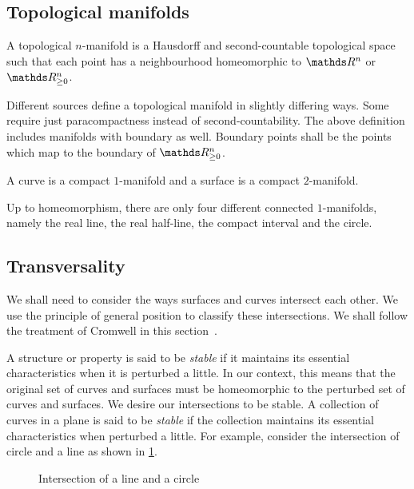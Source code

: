 \subsection{Topological manifolds}

\begin{defn}
    A topological \(n\)-manifold is a Hausdorff and second-countable topological space such that each point has a neighbourhood homeomorphic to \(\R^n\) or \(\R^n_{\geq 0}\).
\end{defn}

\begin{remark}
    Different sources define a topological manifold in slightly differing ways. Some require just paracompactness instead of second-countability. The above definition includes manifolds with boundary as well. Boundary points shall be the points which map to the boundary of \(\R^n_{\geq 0}\).
\end{remark}

\begin{defn}
    A curve is a compact \(1\)-manifold and a surface is a compact \(2\)-manifold.
\end{defn}

Up to homeomorphism, there are only four different connected \(1\)-manifolds, namely the real line, the real half-line, the compact interval and the circle.

\subsection{Transversality}

We shall need to consider the ways surfaces and curves intersect each other. We use the principle of general position to classify these intersections. We shall follow the treatment of Cromwell in this section~\cite[chp.~2, \S~2.10]{cromwell}.

A structure or property is said to be \textit{stable} if it maintains its essential characteristics when it is perturbed a little. In our context, this means that the original set of curves and surfaces must be homeomorphic to the perturbed set of curves and surfaces. We desire our intersections to be stable. A collection of curves in a plane is said to be \textit{stable} if the collection maintains its essential characteristics when perturbed a little. For example, consider the intersection of circle and a line as shown in \cref{fig:intersectionoflineandcircle}.

\begin{figure}
    \centering
    \subcaptionbox{\label{subfig:intersectiona}}{\CWL}\quad\quad
    \subcaptionbox{\label{subfig:intersectionb}}{\CWLO}\quad\quad
    \subcaptionbox{\label{subfig:intersectionc}}{\CWLI}
    \caption{Intersection of a line and a circle}\label{fig:intersectionoflineandcircle}
\end{figure}

